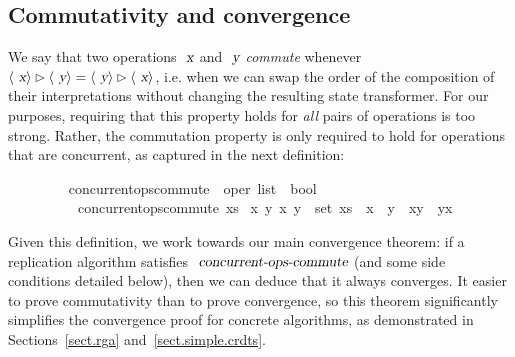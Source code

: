 \subsection{Commutativity and convergence}\label{sect.ops.commute}

We say that two operations $\isa{x}$ and $\isa{y}$ \emph{commute} whenever $\langle\isa{x}\rangle \mathbin{\isasymrhd} \langle\isa{y}\rangle = \langle\isa{y}\rangle \mathbin{\isasymrhd} \langle\isa{x}\rangle$, i.e. when we can swap the order of the composition of their interpretations without changing the resulting state transformer.
For our purposes, requiring that this property holds for \emph{all} pairs of operations is too strong.
Rather, the commutation property is only required to hold for operations that are concurrent, as captured in the next definition:
\vspace{0.375em}
\begin{isabellebody}
\ \ \ \ \ \ \ \  concurrent{\isacharunderscore}ops{\isacharunderscore}commute\ {\isacharcolon}{\isacharcolon}\ {\isachardoublequoteopen}{\isacharprime}oper\ list\ {\isasymRightarrow}\ bool{\isachardoublequoteclose}\ \isanewline
\ \ \ \ \ \ \ \ \ \ {\isachardoublequoteopen}concurrent{\isacharunderscore}ops{\isacharunderscore}commute\ xs\ {\isasymequiv} {\isasymforall}x\ y{\isachardot}\ {\isacharbraceleft}x{\isacharcomma}\ y{\isacharbraceright}\ {\isasymsubseteq}\ set\ xs\ {\isasymlongrightarrow}\ x\ {\isasymparallel}\ y\ {\isasymlongrightarrow}\ {\isasymlangle}x{\isasymrangle}{\isasymrhd}{\isasymlangle}y{\isasymrangle}\ {\isacharequal}\ {\isasymlangle}y{\isasymrangle}{\isasymrhd}{\isasymlangle}x{\isasymrangle}{\isachardoublequoteclose}
\end{isabellebody}
\vspace{0.375em}
\ifextended
Given this definition, we work towards our main convergence theorem: if a replication algorithm satisfies $\isa{concurrent-ops-commute}$ (and some side conditions detailed below), then we can deduce that it always converges.
It easier to prove commutativity than to prove convergence, so this theorem significantly simplifies the convergence proof for concrete algorithms, as demonstrated in Sections~\ref{sect.rga} and~\ref{sect.simple.crdts}.

